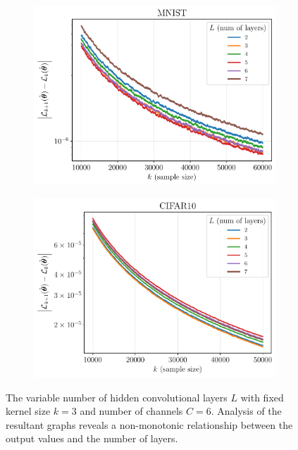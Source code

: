 \documentclass[conference]{IEEEtran}
\begin{document}
\begin{figure}[ht]
  \begin{subfigure}[b]{0.5\linewidth}
    \centering
    \includegraphics[width=\linewidth]{isp/figs/mnist_change_layers.pdf} 
  \end{subfigure}%
  \begin{subfigure}[b]{0.5\linewidth}
    \centering
    \includegraphics[width=\linewidth]{isp/figs/cifar10_change_layers.pdf} 
  \end{subfigure} 
  \caption{The variable number of hidden convolutional layers $L$ with fixed kernel size $k = 3$ and number of channels $C = 6$. Analysis of the resultant graphs reveals a non-monotonic relationship between the output values and the number of layers.}
   \label{fig:layers}
\end{figure}
\end{document}
